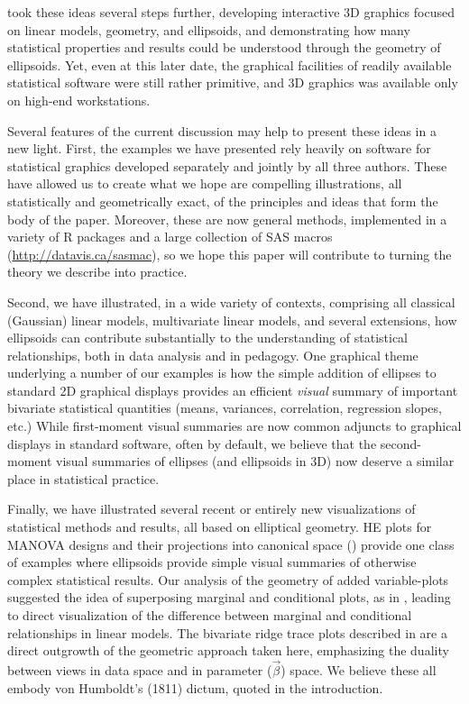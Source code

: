 \citet{Monette:90}
took these ideas several steps further, developing interactive 3D graphics focused on linear
models, geometry, and ellipsoids, and demonstrating how many statistical properties
and results could be understood through the geometry of ellipsoids.  Yet, even at this
later date, the graphical facilities of readily available statistical software were still
rather primitive, and 3D graphics was available only on high-end workstations.


Several features of the current discussion may help to present these ideas in a
new light.  First, the examples we have presented rely heavily on software for
statistical graphics developed separately and jointly by all three authors.
These have allowed us to create what we hope are compelling illustrations,
all statistically and geometrically exact, of the principles and ideas that
form the body of the paper.  Moreover, these are now general methods, implemented
in a variety of R packages
\citep{car,heplots1}
and a large collection of SAS macros (\url{http://datavis.ca/sasmac}),
so we hope this paper will contribute to turning the theory we describe
into practice.

Second, we have illustrated, in a wide variety of contexts,
comprising all classical (Gaussian) linear models, multivariate linear models,
and several extensions,
how ellipsoids can contribute substantially to the understanding of statistical
relationships, both in data analysis and in pedagogy.  One graphical theme underlying
a number of our examples is how the simple addition of ellipses to standard 2D graphical
displays provides an efficient \emph{visual} summary of important bivariate
statistical quantities (means, variances, correlation, regression slopes, etc.)
While first-moment visual summaries are now common adjuncts to graphical displays
in standard software, often by default, we believe that the second-moment visual summaries
of ellipses (and ellipsoids in 3D)
now deserve a similar place in statistical practice.

Finally, we have illustrated several recent or entirely new visualizations of
statistical methods and results, all based on elliptical geometry.
HE plots for MANOVA designs \citep{Friendly:07:manova}
and their projections into canonical space ()
provide one class of examples where ellipsoids provide simple visual summaries of
otherwise complex statistical results.
Our analysis of the geometry of added variable-plots suggested the idea of superposing
marginal and conditional plots, as in , leading to
direct visualization of the difference between marginal and conditional relationships
in linear models.
The bivariate ridge trace plots described in  are a direct outgrowth
of the geometric approach taken here, emphasizing the duality between views in data
space and in parameter ($\vec{\beta}$) space.
We believe these all embody von Humboldt's (1811) dictum, quoted in the introduction.





